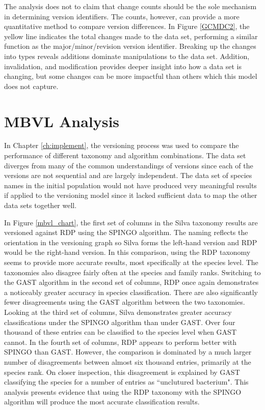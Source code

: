 The analysis does not to claim that change counts should be the sole mechanism in determining version identifiers.
The counts, however, can provide a more quantitative method to compare version differences.
In Figure \ref{GCMDC2}, the yellow line indicates the total changes made to the data set, performing a similar function as the major/minor/revision version identifier.
Breaking up the changes into types reveals additions dominate manipulations to the data set.
Addition, invalidation, and modification provides deeper insight into how a data set is changing, but some changes can be more impactful than others which this model does not capture.

\section{MBVL Analysis}

In Chapter \ref{ch:implement}, the versioning process was used to compare the performance of different taxonomy and algorithm combinations.
The data set diverges from many of the common understandings of versions since each of the versions are not sequential and are largely independent.
The data set of species names in the initial population would not have produced very meaningful results if applied to the versioning model since it lacked sufficient data to map the other data sets together well.

In Figure \ref{mbvl_chart}, the first set of columns in the Silva taxonomy results are versioned against RDP using the SPINGO algorithm.
The naming reflects the orientation in the versioning graph so Silva forms the left-hand version and RDP would be the right-hand version.
In this comparison, using the RDP taxonomy seems to provide more accurate results, most specifically at the species level.
The taxonomies also disagree fairly often at the species and family ranks.
Switching to the GAST algorithm in the second set of columns, RDP once again demonstrates a noticeably greater accuracy in species classification.
There are also significantly fewer disagreements using the GAST algorithm between the two taxonomies.
Looking at the third set of columns, Silva demonstrates greater accuracy classifications under the SPINGO algorithm than under GAST.
Over four thousand of these entries can be classified to the species level when GAST cannot.
In the fourth set of columns, RDP appears to perform better with SPINGO than GAST.
However, the comparison is dominated by a much larger number of disagreements between almost six thousand entries, primarily at the species rank.
On closer inspection, this disagreement is explained by GAST classifying the species for a number of entries as ``unclutured bacterium".
This analysis presents evidence that using the RDP taxonomy with the SPINGO algorithm will produce the most accurate classification results.


